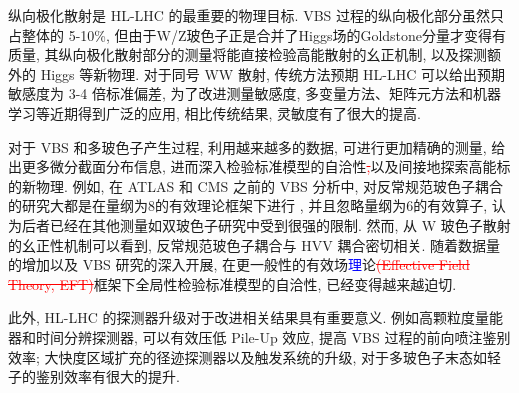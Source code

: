 \documentclass{SCIS2020cn}
\newcommand{\add}{\textcolor{blue}}
\newcommand{\rmv}[1]{\textcolor{red}{\sout{#1}}}
\begin{document}
纵向极化散射是 HL-LHC 的最重要的物理目标. VBS 过程的纵向极化部分虽然只占整体的 5-10\%, 但由于W/Z玻色子正是合并了Higgs场的Goldstone分量才变得有质量, 其纵向极化散射部分的测量将能直接检验高能散射的幺正机制, 以及探测额外的 Higgs 等新物理. 对于同号 WW 散射, 传统方法预期 HL-LHC 可以给出预期敏感度为 3-4 倍标准偏差, 为了改进测量敏感度, 多变量方法、矩阵元方法和机器学习等近期得到广泛的应用, 相比传统结果, 灵敏度有了很大的提高.

对于 VBS 和多玻色子产生过程, 利用越来越多的数据, 可进行更加精确的测量, 给出更多微分截面分布信息, 进而深入检验标准模型的自洽性\rmv{,}以及间接地探索高能标的新物理. 例如, 在 ATLAS 和 CMS 之前的 VBS 分析中, 对反常规范玻色子耦合的研究大都是在量纲为8的有效理论框架下进行 , 并且忽略量纲为6的有效算子, 认为后者已经在其他测量如双玻色子研究中受到很强的限制. 然而, 从 W 玻色子散射的幺正性机制可以看到, 反常规范玻色子耦合与 HVV 耦合密切相关. 随着数据量的增加以及 VBS 研究的深入开展, 在更一般性的有效场\add{理}论\rmv{(Effective Field Theory, EFT)}框架下全局性检验标准模型的自洽性, 已经变得越来越迫切.

此外, HL-LHC 的探测器升级对于改进相关结果具有重要意义. 例如高颗粒度量能器和时间分辨探测器, 可以有效压低 Pile-Up 效应, 提高 VBS 过程的前向喷注鉴别效率; 大快度区域扩充的径迹探测器以及触发系统的升级, 对于多玻色子末态如轻子的鉴别效率有很大的提升.

\newpage
{}

\end{document}
